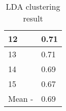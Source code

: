 \begin{table}[h]
\begin{tabular}{|l|l|}
12                                                                                      & 0.71                                    \\ \hline
13                                                                                     & 0.71                                    \\ \hline
14                                                                                     & 0.69                                    \\ \hline
15                                                                                      & 0.67                                    \\ \hline
Mean                                       -                                            & 0.69                                    \\ \hline
\end{tabular}
\caption{LDA clustering result}
\label{tab:LDAClusters}
\end{table}




